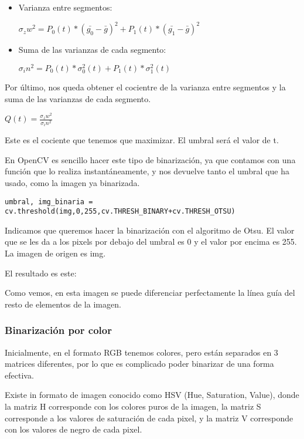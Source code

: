 \begin{itemize}

\item Varianza entre segmentos:

$\sigma{_zw^2} = P_0(t)*(\bar{g_0}-\bar{g})^2 + P_1(t)*(\bar{g_1}-\bar{g})^2$

\item Suma de las varianzas de cada segmento:

$\sigma{_in^2} = P_0(t)*\sigma{_0^2}(t)+P_1(t)*\sigma{_1^2}(t)$

\end{itemize}

Por último, nos queda obtener el cocientre de la varianza entre segmentos y la suma de las varianzas de cada segmento.

$Q(t) = \displaystyle\frac{\sigma{_zw^2}}{\sigma{_in^2}}$

Este es el cociente que tenemos que maximizar. El umbral será el valor de t.

En OpenCV es sencillo hacer este tipo de binarización, ya que contamos con una función que lo realiza instantáneamente, y nos devuelve tanto el umbral que ha usado, como la imagen ya binarizada.

\begin{verbatim}
umbral, img_binaria = cv.threshold(img,0,255,cv.THRESH_BINARY+cv.THRESH_OTSU)
\end{verbatim}

Indicamos que queremos hacer la binarización con el algoritmo de Otsu. El valor que se les da a los pixels por debajo del umbral es 0 y el valor por encima es 255. La imagen de origen es img.

El resultado es este:


Como vemos, en esta imagen se puede diferenciar perfectamente la línea guía del resto de elementos de la imagen.

\subsubsection{Binarización por color}
Inicialmente, en el formato RGB tenemos colores, pero están separados en 3 matrices diferentes, por lo que es complicado poder binarizar de una forma efectiva. 

Existe in formato de imagen conocido como HSV\cite{hsl_hsv} (Hue, Saturation, Value), donde la matriz H corresponde con los colores puros de la imagen, la matriz S corresponde a los valores de saturación de cada pixel, y la matriz V corresponde con los valores de negro de cada pixel.

